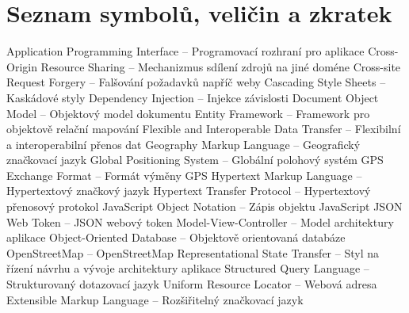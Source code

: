 \cleardoublepage
\chapter*{Seznam symbolů, veličin a zkratek}
{}

\begin{acronym}[KolikMista]
		{Application Programming Interface -- Programovací rozhraní pro aplikace}
	    {Cross-Origin Resource Sharing -- Mechanizmus sdílení zdrojů na jiné doméne} 
	    {Cross-site Request Forgery -- Falšování požadavků napříč weby}
	    {Cascading Style Sheets -- Kaskádové styly}  
	    {Dependency Injection -- Injekce závislosti}   
	    {Document Object Model -- Objektový model dokumentu}   
	    {Entity Framework -- Framework pro objektově relační mapování}    
		{Flexible and Interoperable Data Transfer -- Flexibilní a interoperabilní přenos dat}	
	    {Geography Markup Language -- Geografický značkovací jazyk}
	    {Global Positioning System -- Globální polohový systém}
	    {GPS Exchange Format -- Formát výměny GPS}
	    {Hypertext Markup Language -- Hypertextový značkový jazyk}    
	    {Hypertext Transfer Protocol -- Hypertextový přenosový protokol}
	    {JavaScript Object Notation -- Zápis objektu JavaScript}
	    {JSON Web Token -- JSON webový token}
	    {Model-View-Controller -- Model architektury aplikace}
	    {Object-Oriented Database -- Objektově orientovaná databáze}    
	    {OpenStreetMap -- OpenStreetMap}    
	    {Representational State Transfer -- Styl na řízení návrhu a vývoje architektury aplikace}  
	    {Structured Query Language -- Strukturovaný dotazovací jazyk}   
	    {Uniform Resource Locator -- Webová adresa}    
	    {Extensible Markup Language -- Rozšiřitelný značkovací jazyk}
	    
\end{acronym}